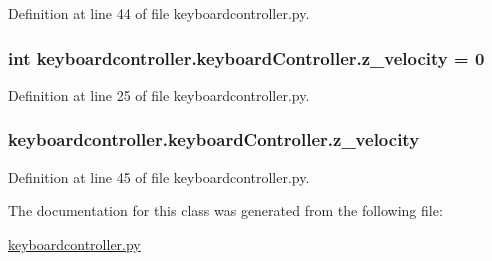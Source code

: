 Definition at line 44 of file keyboardcontroller.\-py.

\hypertarget{classkeyboardcontroller_1_1keyboardController_acd872657c7c07b6c37bbaa6021dc1722}{
\subsubsection[{z\-\_\-velocity}]{\setlength{\rightskip}{0pt plus 5cm}int keyboardcontroller.\-keyboard\-Controller.\-z\-\_\-velocity = 0\hspace{0.3cm}{\ttfamily [static]}}}\label{classkeyboardcontroller_1_1keyboardController_acd872657c7c07b6c37bbaa6021dc1722}


Definition at line 25 of file keyboardcontroller.\-py.

\hypertarget{classkeyboardcontroller_1_1keyboardController_a7872c41368e57d177dd6f4660b1447af}{
\subsubsection[{z\-\_\-velocity}]{\setlength{\rightskip}{0pt plus 5cm}keyboardcontroller.\-keyboard\-Controller.\-z\-\_\-velocity}}\label{classkeyboardcontroller_1_1keyboardController_a7872c41368e57d177dd6f4660b1447af}


Definition at line 45 of file keyboardcontroller.\-py.



The documentation for this class was generated from the following file\-:\begin{DoxyCompactItemize}
\item 
\hyperlink{keyboardcontroller_8py}{keyboardcontroller.\-py}\end{DoxyCompactItemize}

